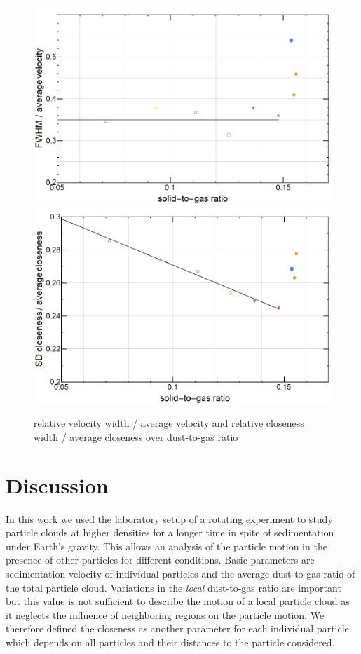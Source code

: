 \begin{figure}[h]
\includegraphics[width=\columnwidth]{fwhm_velocity.png}
\includegraphics[width=\columnwidth]{sd_close.png}
    \caption{\label{fig.fluctuate} relative velocity width / average velocity and relative closeness width / average closeness over dust-to-gas ratio}
\end{figure}


\section{Discussion}


In this work we used the laboratory setup of a rotating experiment to study particle clouds at higher densities for a longer time in spite of sedimentation under Earth's gravity.
This allows an analysis of the particle motion in the presence of other particles for different conditions. 
Basic parameters are sedimentation velocity of individual particles and the average dust-to-gas ratio of the total particle cloud.
Variations in the \textit{local} dust-to-gas ratio are important but this value is not sufficient to describe the motion of a local particle cloud as it neglects the influence of neighboring regions on the particle motion. We therefore defined the closeness as another parameter
for each individual particle which depends on all particles and their distances 
to the particle considered.

